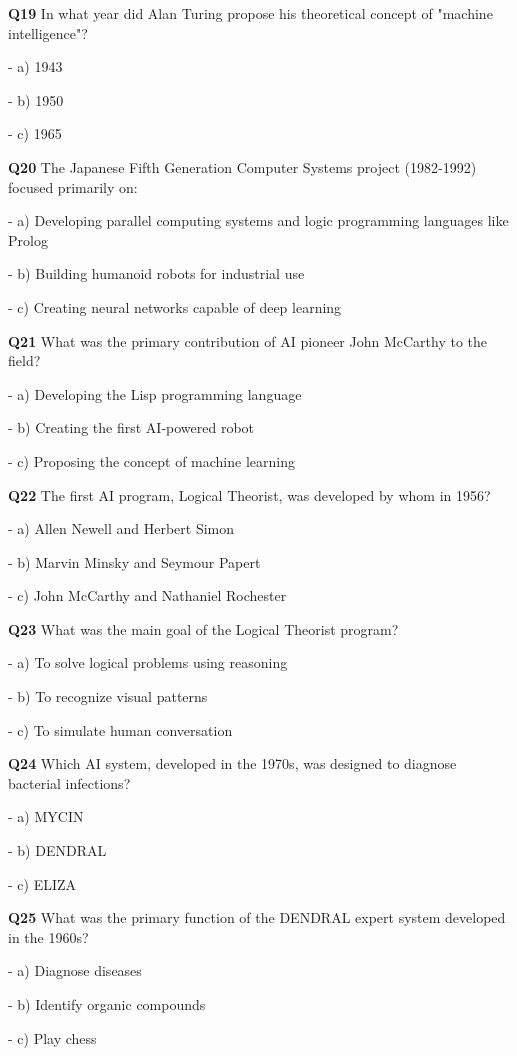 \textbf{Q19} In what year did Alan Turing propose his theoretical concept of "machine intelligence"?\par
\quad - a) 1943\par
\quad - b) 1950\par
\quad - c) 1965\par

\textbf{Q20} The Japanese Fifth Generation Computer Systems project (1982‑1992) focused primarily on:\par
\quad - a) Developing parallel computing systems and logic programming languages like Prolog\par
\quad - b) Building humanoid robots for industrial use\par
\quad - c) Creating neural networks capable of deep learning\par

\textbf{Q21} What was the primary contribution of AI pioneer John McCarthy to the field?\par
\quad - a) Developing the Lisp programming language\par
\quad - b) Creating the first AI‑powered robot\par
\quad - c) Proposing the concept of machine learning\par

\textbf{Q22} The first AI program, Logical Theorist, was developed by whom in 1956?\par
\quad - a) Allen Newell and Herbert Simon\par
\quad - b) Marvin Minsky and Seymour Papert\par
\quad - c) John McCarthy and Nathaniel Rochester\par

\textbf{Q23} What was the main goal of the Logical Theorist program?\par
\quad - a) To solve logical problems using reasoning\par
\quad - b) To recognize visual patterns\par
\quad - c) To simulate human conversation\par

\textbf{Q24} Which AI system, developed in the 1970s, was designed to diagnose bacterial infections?\par
\quad - a) MYCIN\par
\quad - b) DENDRAL\par
\quad - c) ELIZA\par

\textbf{Q25} What was the primary function of the DENDRAL expert system developed in the 1960s?\par
\quad - a) Diagnose diseases\par
\quad - b) Identify organic compounds\par
\quad - c) Play chess\par

